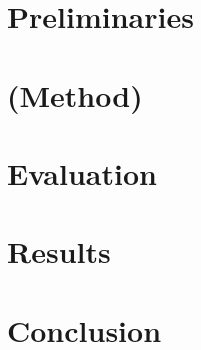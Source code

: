 \documentclass{llncs}
\begin{document}




\section{Preliminaries} %
\section{(Method)} %
\section{Evaluation} %
\section{Results}    %
\section{Conclusion}
\newpage


\end{document}
